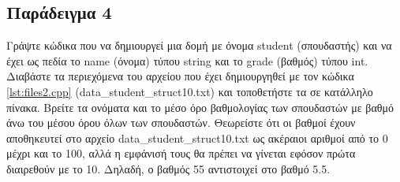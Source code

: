 
 
\subsection{Παράδειγμα 4}
Γράψτε κώδικα που να δημιουργεί μια δομή με όνομα student (σπουδαστής) και να έχει ως πεδία το name (όνομα) τύπου string και το grade (βαθμός) τύπου int. Διαβάστε τα περιεχόμενα του αρχείου που έχει δημιουργηθεί με τον κώδικα \ref{lst:files2.cpp} (data\_student\_struct10.txt) και τοποθετήστε τα σε κατάλληλο πίνακα. Βρείτε τα ονόματα και το μέσο όρο βαθμολογίας των σπουδαστών με βαθμό άνω του μέσου όρου όλων των σπουδαστών. Θεωρείστε ότι οι βαθμοί έχουν αποθηκευτεί στο αρχείο data\_student\_struct10.txt ως ακέραιοι αριθμοί από το 0 μέχρι και το 100, αλλά η εμφάνισή τους θα πρέπει να γίνεται εφόσον πρώτα διαιρεθούν με το 10. Δηλαδή, ο βαθμός 55 αντιστοιχεί στο βαθμό 5.5.





